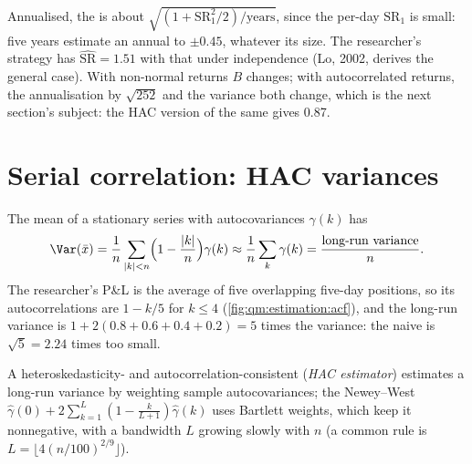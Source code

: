 Annualised, the  is about $\sqrt{(1 + \mathrm{SR}_1^2/2)/\text{years}}$, since the per-day  $\mathrm{SR}_1$ is small:
five years estimate an annual  to $\pm 0.45$, whatever its size. The researcher's strategy has $\widehat{\mathrm{SR}} = 1.51$
with that  under independence (Lo, 2002, derives the general case). With non-normal returns $B$ changes;
with autocorrelated returns, the annualisation by $\sqrt{252}$ and the variance both change, which is the next section's
subject: the HAC version of the same  gives 0.87.

\section{Serial correlation: HAC variances}

The mean of a stationary series with autocovariances $\gamma(k)$ has
\[
\Var(\bar x) = \frac1n\sum_{|k|<n}\Bigl(1 - \frac{|k|}n\Bigr)\gamma(k) \approx \frac1n\sum_k\gamma(k) = \frac{\text{long-run variance}}n.
\]
The researcher's P\&L is the average of five overlapping five-day positions, so its autocorrelations are $1 - k/5$ for $k
\le 4$ (\cref{fig:qm:estimation:acf}), and the long-run variance is $1 + 2(0.8 + 0.6 + 0.4 + 0.2) = 5$ times the variance: the naive
 is $\sqrt5 = 2.24$ times too small.

\begin{definition}\label{def:qm:estimation:hac}
A heteroskedasticity- and autocorrelation-consistent (\emph{HAC estimator}) estimates a long-run
variance by weighting sample autocovariances; the Newey--West  $\hat\gamma(0) + 2\sum_{k=1}^L(1 - \frac k{L+1})\hat\gamma(k)$
uses Bartlett weights, which keep it nonnegative, with a bandwidth $L$ growing slowly with $n$ (a common rule is $L =
\lfloor4(n/100)^{2/9}\rfloor$).
\end{definition}

